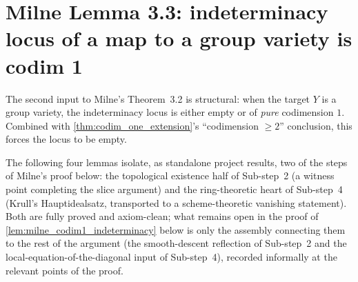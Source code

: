 \section{Milne Lemma 3.3: indeterminacy locus of a map to a group variety is codim 1}
\label{sec:milne_lem33}

The second input to Milne's Theorem~3.2 is structural: when the target \(Y\) is a group
variety, the indeterminacy locus is either empty or of \emph{pure} codimension \(1\).
Combined with \cref{thm:codim_one_extension}'s ``codimension \(\geq 2\)'' conclusion,
this forces the locus to be empty.

The following four lemmas isolate, as standalone project results, two of the
steps of Milne's proof below: the topological existence half of Sub-step~2 (a
witness point completing the slice argument) and the ring-theoretic heart of
Sub-step~4 (Krull's Hauptidealsatz, transported to a scheme-theoretic
vanishing statement). Both are fully proved and axiom-clean; what remains
open in the proof of \cref{lem:milne_codim1_indeterminacy} below is only the
assembly connecting them to the rest of the argument (the smooth-descent
reflection of Sub-step~2 and the local-equation-of-the-diagonal input of
Sub-step~4), recorded informally at the relevant points of the proof.

